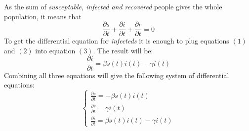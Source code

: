 As the sum of \textit{susceptable, infected and recovered} people gives the whole population, it means that\\
\begin{equation}
    \frac{\partial s}{\partial t} + \frac{\partial i}{\partial t}+\frac{\partial r}{\partial t} = 0
\end{equation}
To get the differential equation for \textit{infecteds} it is enough to plug equations $(1)$ and $(2)$ into equation $(3)$.
The result will be:
\begin{equation}
    \frac{\partial i}{\partial t} = \beta s(t)  i(t) - \gamma i(t)
\end{equation}
Combining all three equations will give the following system of differential equations:
\[
\left\{
    \begin{array}{l}
        \frac{\partial s}{\partial t} = -\beta s(t)  i(t)\\
        \frac{\partial r}{\partial t} = \gamma i(t)\\
        \frac{\partial i}{\partial t} = \beta s(t)  i(t) - \gamma i(t)
    \end{array}
\right.
\]



